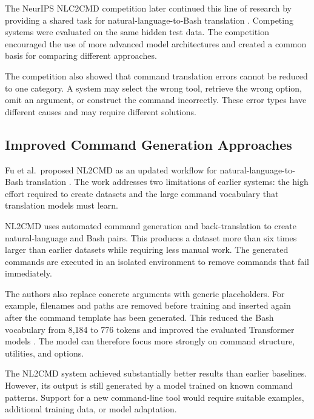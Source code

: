 The NeurIPS NLC2CMD competition later continued this line of research by providing a shared task for natural-language-to-Bash translation \cite{agarwal2021nlc2cmd}. Competing systems were evaluated on the same hidden test data. The competition encouraged the use of more advanced model architectures and created a common basis for comparing different approaches.

The competition also showed that command translation errors cannot be reduced to one category. A system may select the wrong tool, retrieve the wrong option, omit an argument, or construct the command incorrectly. These error types have different causes and may require different solutions.

\subsection{Improved Command Generation Approaches}
Fu et al.\ proposed NL2CMD as an updated workflow for natural-language-to-Bash translation \cite{fu2023nl2cmd}. The work addresses two limitations of earlier systems: the high effort required to create datasets and the large command vocabulary that translation models must learn.

NL2CMD uses automated command generation and back-translation to create natural-language and Bash pairs. This produces a dataset more than six times larger than earlier datasets while requiring less manual work. The generated commands are executed in an isolated environment to remove commands that fail immediately.

The authors also replace concrete arguments with generic placeholders. For example, filenames and paths are removed before training and inserted again after the command template has been generated. This reduced the Bash vocabulary from 8,184 to 776 tokens and improved the evaluated Transformer models \cite{fu2023nl2cmd}. The model can therefore focus more strongly on command structure, utilities, and options.

The NL2CMD system achieved substantially better results than earlier baselines. However, its output is still generated by a model trained on known command patterns. Support for a new command-line tool would require suitable examples, additional training data, or model adaptation.

